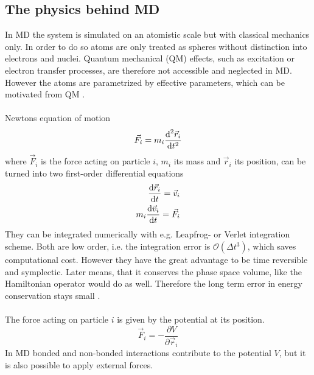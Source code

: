 \subsection{The physics behind MD}
In MD the system is simulated on an atomistic scale but with classical mechanics only. In order to do so atoms are only treated as spheres without distinction into electrons and nuclei. Quantum mechanical (QM) effects, such as excitation or electron transfer processes, are therefore not accessible and neglected in MD. However the atoms are parametrized by effective parameters, which can be motivated from QM \autocite[p. 127f]{greenBook}.\\
\\
Newtons equation of motion
\begin{equation}
\vec{F}_i = m_i\frac{\text{d}^2 \vec{r}_i}{\text{d} t^2}
\end{equation}
where $\vec{F}_i$ is the force acting on particle $i$, $m_i$ its mass and $\vec{r}_i$ its position, can be turned into two first-order differential equations
\begin{align}
\label{eq:eq_of_mot_first_order}
\frac{\text{d} \vec{r}_i}{\text{d} t} = \vec{v}_i \\
m_i \frac{\text{d} \vec{v}_i}{\text{d} t} = \vec{F}_i
\end{align}
They can be integrated numerically with e.g. Leapfrog- or Verlet integration scheme. Both are low order, i.e. the integration error is $\mathcal{O}(\Delta t^3)$, which saves computational cost. However they have the great advantage to be time reversible and symplectic. Later means, that it conserves the phase space volume, like the Hamiltonian operator would do as well. Therefore the long term error in energy conservation stays small \autocite[p. 72ff]{UnderstandingMD}.\\
\\
The force acting on particle $i$ is given by the potential at its position.
\begin{equation}
\vec{F}_i = - \frac{\partial V}{\partial \vec{r}_i}
\end{equation}
In MD bonded and non-bonded interactions contribute to the potential $V$, but it is also possible to apply external forces.
